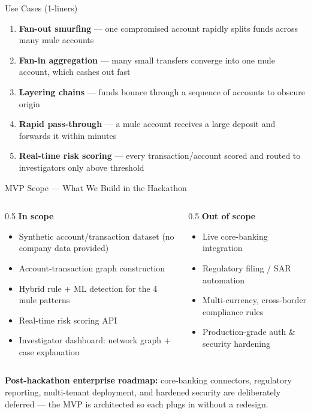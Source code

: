 \documentclass[aspectratio=169]{beamer}
\begin{document}
\begin{frame}{Use Cases (1-liners)}
\begin{enumerate}
\item \textbf{Fan-out smurfing} --- one compromised account rapidly splits funds across many mule accounts
\item \textbf{Fan-in aggregation} --- many small transfers converge into one mule account, which cashes out fast
\item \textbf{Layering chains} --- funds bounce through a sequence of accounts to obscure origin
\item \textbf{Rapid pass-through} --- a mule account receives a large deposit and forwards it within minutes
\item \textbf{Real-time risk scoring} --- every transaction/account scored and routed to investigators only above threshold
\end{enumerate}
\end{frame}

\begin{frame}{MVP Scope --- What We Build in the Hackathon}
\begin{columns}[T]
\begin{column}{0.5\textwidth}
\textbf{In scope}
\begin{itemize}
\small
\item Synthetic account/transaction dataset (no company data provided)
\item Account-transaction graph construction
\item Hybrid rule + ML detection for the 4 mule patterns
\item Real-time risk scoring API
\item Investigator dashboard: network graph + case explanation
\end{itemize}
\end{column}
\begin{column}{0.5\textwidth}
\textbf{Out of scope}
\begin{itemize}
\small
\item Live core-banking integration
\item Regulatory filing / SAR automation
\item Multi-currency, cross-border compliance rules
\item Production-grade auth \& security hardening
\end{itemize}
\end{column}
\end{columns}

\vspace{0.5em}
\footnotesize \textbf{Post-hackathon enterprise roadmap:} core-banking connectors, regulatory reporting, multi-tenant deployment, and hardened security are deliberately deferred --- the MVP is architected so each plugs in without a redesign.
\end{frame}
\end{document}
